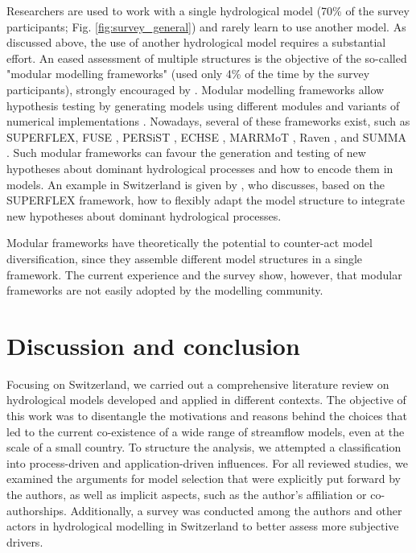 \documentclass[10pt,a4paper]{article}
\begin{document}
Researchers are used to work with a single hydrological model (70\% of the survey participants; Fig. \ref{fig:survey_general}) and rarely learn to use another model. As discussed above, the use of another hydrological model requires a substantial effort. An eased assessment of multiple structures is the objective of the so-called "modular modelling frameworks" (used only 4\% of the time by the survey participants), strongly encouraged by \citet{Clark2011a}. Modular modelling frameworks allow hypothesis testing by generating models using different modules and variants of numerical implementations \citep{LaFollette2021}. Nowadays, several of these frameworks exist, such as SUPERFLEX, FUSE \citep{Clark2008}, PERSiST \citep{Futter2014}, ECHSE \citep{Kneis2015}, MARRMoT \citep{Knoben2019}, Raven \citep{Craig2020}, and SUMMA \citep{Clark2015}. Such modular frameworks can favour the generation and testing of new hypotheses about dominant hydrological processes and how to encode them in models. An example in Switzerland is given by \citet{DalMolin2020}, who discusses, based on the SUPERFLEX framework, how to flexibly adapt the model structure to integrate new hypotheses about dominant hydrological processes. 

Modular frameworks have theoretically the potential to counter-act model diversification, since they assemble different model structures in a single framework. The current experience and the survey show, however, that modular frameworks are not easily adopted by the modelling community. 


\section{Discussion and conclusion}
\label{sec:conclusion}

Focusing on Switzerland, we carried out a comprehensive literature review on hydrological models developed and applied in different contexts. The objective of this work was to disentangle the motivations and reasons behind the choices that led to the current co-existence of a wide range of streamflow models, even at the scale of a small country. To structure the analysis, we attempted a classification into process-driven and application-driven influences. For all reviewed studies, we examined the arguments for model selection that were explicitly put forward by the authors, as well as implicit aspects, such as the author's affiliation or co-authorships. Additionally, a survey was conducted among the authors and other actors in hydrological modelling in Switzerland to better assess more subjective drivers.
\end{document}
